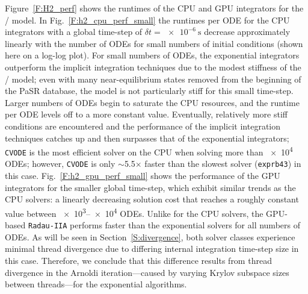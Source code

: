 \documentclass[preprint]{elsarticle}
\begin{document}
Figure~\ref{F:H2_perf} shows the runtimes of the CPU and GPU integrators for the \slash{} model.
In Fig.~\ref{F:h2_cpu_perf_small} the runtimes per ODE for the CPU integrators with a global time-step of $\delta t= \SI{e-6}{\second}$ decrease approximately linearly with the number of ODEs for small numbers of initial conditions (shown here on a log-log plot).
For small numbers of ODEs, the exponential integrators outperform the implicit integration techniques due to the modest stiffness of the \slash{} model; even with many near-equilibrium states removed from the beginning of the PaSR database, the model is not particularly stiff for this small time-step.
Larger numbers of ODEs begin to saturate the CPU resources, and the runtime per ODE levels off to a more constant value.
Eventually, relatively more stiff conditions are encountered and the performance of the implicit integration techniques catches up and then surpasses that of the exponential integrators; \texttt{CVODE} is the most efficient solver on the CPU when solving more than \num{e4} ODEs; however, \texttt{CVODE} is only $\sim$\num{5.5}$\times$ faster than the slowest solver (\texttt{exprb43}) in this case.
Fig.~\ref{F:h2_gpu_perf_small} shows the performance of the GPU integrators for the smaller global time-step, which exhibit similar trends as the CPU solvers: a linearly decreasing solution cost that reaches a roughly constant value between \numrange{e3}{e4} ODEs.
Unlike for the CPU solvers, the GPU-based \texttt{Radau-IIA} performs faster than the exponential solvers for all numbers of ODEs.
As will be seen in Section~\ref{S:divergence}, both solver classes experience minimal thread divergence due to differing internal integration time-step size in this case.
Therefore, we conclude that this difference results from thread divergence in the Arnoldi iteration---caused by varying Krylov subspace sizes between threads---for the exponential algorithms.
\end{document}
